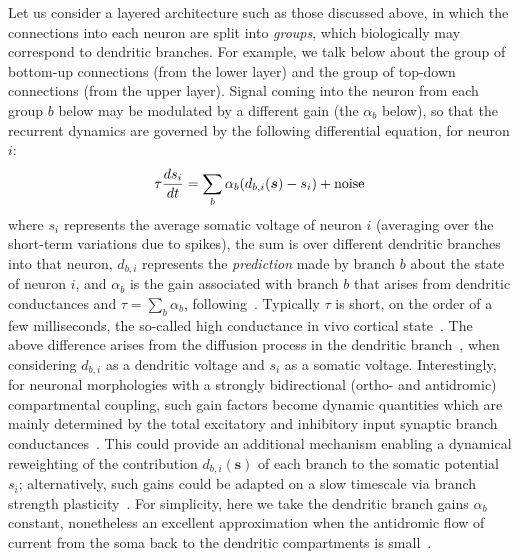 \documentclass{article}
\newcommand   \vs{{\bm s}}
\begin{document}
Let us consider a layered architecture such as those discussed above,
in which the connections into each neuron are split into {\em groups},
which biologically may correspond to dendritic branches. For example,
we talk below about the group of bottom-up connections (from the lower layer)
and the group of top-down connections (from the upper layer).
Signal coming into the neuron from each group $b$ below may be modulated by
a different gain (the $\alpha_b$ below), so that
the recurrent dynamics are governed by the following differential
equation, for neuron $i$:
\begin{equation}
  \label{eq:multi-branch-update}
  \tau \frac{ds_i}{dt} = \sum_b \alpha_b (d_{b,i}(\vs) - s_i) + {\rm noise}
\end{equation}
where $s_i$ represents the average somatic voltage of neuron $i$ (averaging
over the short-term variations due to spikes),
the sum is over different dendritic branches into that neuron,
$d_{b,i}$ represents the {\em prediction} made by branch $b$ about the
state of neuron $i$, and $\alpha_b$ is the gain associated
with branch $b$ that arises from dendritic conductances
and $\tau = \sum_b \alpha_b$, following~\citet{Urbanczik+Senn-2014}. Typically
$\tau$ is short, on the order of a few milliseconds, the so-called high conductance
in vivo cortical state~\citep{Destexhe2003}. The above difference arises from the diffusion process in the dendritic
branch~\citep{Koch2004}, when considering $d_{b,i}$ as a dendritic voltage and
$s_i$ as a somatic voltage. Interestingly, for neuronal morphologies with a
strongly bidirectional (ortho- and antidromic) compartmental coupling, such
gain factors become dynamic quantities which are mainly determined by the total
excitatory and inhibitory input synaptic branch
conductances~\citep{Sacramento2016}. This could provide an additional mechanism
enabling a dynamical reweighting of the contribution $d_{b,i}(\vs)$ of each
branch to the somatic potential $s_i$; alternatively, such gains could be
adapted on a slow timescale via branch strength plasticity~\citep{Losonczy2008}.
For simplicity, here we take the dendritic branch gains $\alpha_b$ constant,
nonetheless an excellent approximation when the antidromic flow of current from
the soma back to the dendritic compartments is
small~\citep{Urbanczik+Senn-2014}.
\end{document}
